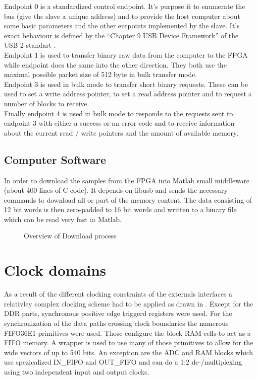 Endpoint 0 is a standardized control endpoint. It's purpose it to
enumerate the bus (give the slave a unique address) and to provide the
host computer about some basic parameters and the other entpoints
implemented by the slave. It's exact behaviour is defined by the
``Chapter 9 USB Device Framework'' of the USB 2 standart . \\

Endpoint 1 is used to transfer binary raw data from the computer to the \gls{FPGA}
while endpoint does the same into the other direction. They both use the maximal
possible packet size of 512 byte in bulk transfer mode. \\

Endpoint 3 is used in bulk mode to transfer short binary requests.
These can be used to set a write address pointer, to set a read address pointer
and to request a number of blocks to receive. \\

Finally endpoint 4 is used in bulk mode to responde to the requests sent
to endpoint 3 with either a success or an error code and to receive information
about the current read / write pointers and the amount of available memory. \\

\subsection{Computer Software}
In order to download the samples from the \gls{FPGA} into Matlab small 
middleware (about 400 lines of C code). It depends on libusb 
and sends the necessary commands to download all or part of the memory content.
The data consisting of 12 bit words is then zero-padded to 16 bit words
and written to a binary file which can be read very fast in Matlab.

\begin{figure}[ht]
  \centering
  \caption{Overview of Download process}
  \label{fig:fpga_architecture_overview}
\end{figure}

\section{Clock domains}
\label{sec:fpga_clocks}

As a result of the different clocking constraints of the externals interfaces
a relativley complex clocking scheme had to be applied as drawn in
. Except for the \gls{DDR} parts,
synchronous positive edge triggerd registers were used. For the synchronization
of the data paths crossing clock boundaries the numerous FIFO36E1 primitives
were used. Those configure the block \gls{RAM} cells to act as a \gls{FIFO}
memory.
A wrapper is used to use many of those primitives to allow for the
wide vectors of up to 540 bits.
 An exception are the \gls{ADC} and \gls{RAM} blocks which use
spezicalized IN\_FIFO and OUT\_FIFO and can do a 1:2 de-/multiplexing
using two independent input and output clocks. \\

